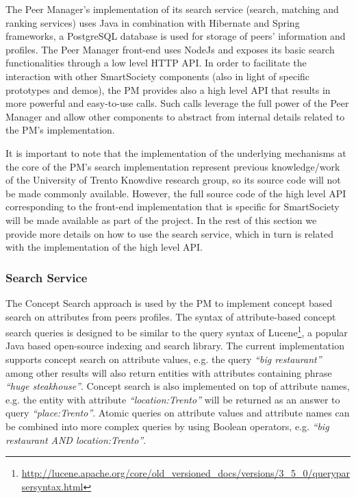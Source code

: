 The Peer Manager's implementation of its search service (search, matching and ranking services) uses Java in combination with Hibernate and Spring frameworks, a PostgreSQL database is used for storage of peers' information and profiles. The Peer Manager front-end uses NodeJs and exposes its basic search functionalities through a low level HTTP API. In order to facilitate the interaction with other SmartSociety components (also in light of specific prototypes and demos), the PM provides also a high level API that results in more powerful and easy-to-use calls. Such calls leverage the full power of the Peer Manager and allow other components to abstract from internal details related to the PM's implementation. 

It is important to note that the implementation of the underlying mechanisms at the core of the PM's search implementation represent previous knowledge/work of the University of Trento Knowdive research group, so its source code will not be made commonly available. However, the full source code of the high level API corresponding to the front-end implementation that is specific for SmartSociety will be made available as part of the project. In the rest of this section we provide more details on how to use the search service, which in turn is related with the implementation of the high level API. 

\subsubsection{Search Service}\label{subsec:concept_search}

The Concept Search approach is used by the PM to implement concept based search on attributes from peers profiles.
The syntax of attribute-based concept search queries is designed to be similar to the query syntax of Lucene\footnote{\url{http://lucene.apache.org/core/old_versioned_docs/versions/3_5_0/queryparsersyntax.html}}, a popular Java based open-source indexing and search library. The current implementation supports concept search on attribute values, e.g. the query \emph{``big restaurant''} among other results will also return entities with attributes containing phrase \emph{``huge steakhouse''}. Concept search is also implemented on top of attribute names, e.g. the entity with attribute \emph{``location:Trento''} will be returned as an answer to query \emph{``place:Trento''}. Atomic queries on attribute values and attribute names can be combined into more complex queries by using Boolean operators, e.g. \emph{``big restaurant AND location:Trento''}.

